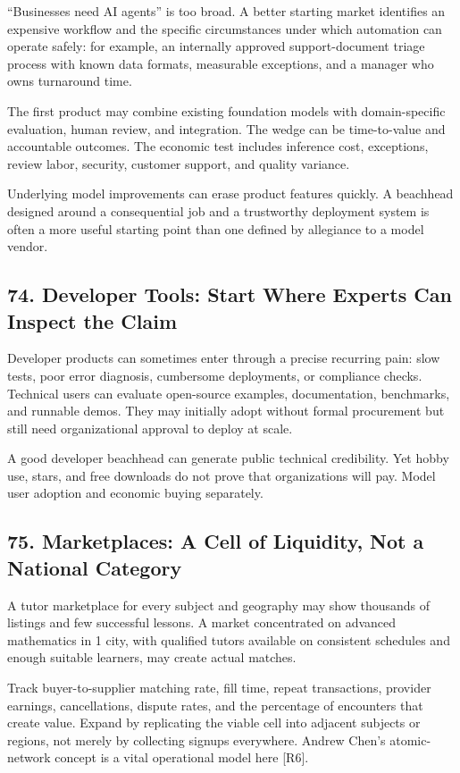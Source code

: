 ``Businesses need AI agents'' is too broad. A better starting market identifies an expensive workflow and the specific circumstances under which automation can operate safely: for example, an internally approved support-document triage process with known data formats, measurable exceptions, and a manager who owns turnaround time.

The first product may combine existing foundation models with domain-specific evaluation, human review, and integration. The wedge can be time-to-value and accountable outcomes. The economic test includes inference cost, exceptions, review labor, security, customer support, and quality variance.

Underlying model improvements can erase product features quickly. A beachhead designed around a consequential job and a trustworthy deployment system is often a more useful starting point than one defined by allegiance to a model vendor.

\subsection*{74. Developer Tools: Start Where Experts Can Inspect the Claim}

Developer products can sometimes enter through a precise recurring pain: slow tests, poor error diagnosis, cumbersome deployments, or compliance checks. Technical users can evaluate open-source examples, documentation, benchmarks, and runnable demos. They may initially adopt without formal procurement but still need organizational approval to deploy at scale.

A good developer beachhead can generate public technical credibility. Yet hobby use, stars, and free downloads do not prove that organizations will pay. Model user adoption and economic buying separately.

\subsection*{75. Marketplaces: A Cell of Liquidity, Not a National Category}

A tutor marketplace for every subject and geography may show thousands of listings and few successful lessons. A market concentrated on advanced mathematics in 1 city, with qualified tutors available on consistent schedules and enough suitable learners, may create actual matches.

Track buyer-to-supplier matching rate, fill time, repeat transactions, provider earnings, cancellations, dispute rates, and the percentage of encounters that create value. Expand by replicating the viable cell into adjacent subjects or regions, not merely by collecting signups everywhere. Andrew Chen's atomic-network concept is a vital operational model here [R6].

